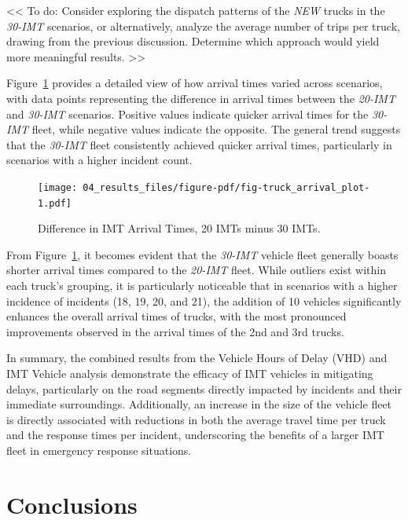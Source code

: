 \documentclass[fancy, oneside, mastersfancy, ms]{byuthesis}
\begin{document}
\textless\textless{} To do: Consider exploring the dispatch patterns of
the \emph{NEW} trucks in the \emph{30-IMT} scenarios, or alternatively,
analyze the average number of trips per truck, drawing from the previous
discussion. Determine which approach would yield more meaningful
results. \textgreater\textgreater{}

Figure~\ref{fig-truck_arrival_plot} provides a detailed view of how
arrival times varied across scenarios, with data points representing the
difference in arrival times between the \emph{20-IMT} and \emph{30-IMT}
scenarios. Positive values indicate quicker arrival times for the
\emph{30-IMT} fleet, while negative values indicate the opposite. The
general trend suggests that the \emph{30-IMT} fleet consistently
achieved quicker arrival times, particularly in scenarios with a higher
incident count.

\begin{figure}

{\centering \texttt{[image: 04\_results\_files/figure-pdf/fig-truck\_arrival\_plot-1.pdf]}

}

\caption{\label{fig-truck_arrival_plot}Difference in IMT Arrival Times,
20 IMTs minus 30 IMTs.}

\end{figure}

From Figure~\ref{fig-truck_arrival_plot}, it becomes evident that the
\emph{30-IMT} vehicle fleet generally boasts shorter arrival times
compared to the \emph{20-IMT} fleet. While outliers exist within each
truck's grouping, it is particularly noticeable that in scenarios with a
higher incidence of incidents (18, 19, 20, and 21), the addition of 10
vehicles significantly enhances the overall arrival times of trucks,
with the most pronounced improvements observed in the arrival times of
the 2nd and 3rd trucks.

In summary, the combined results from the Vehicle Hours of Delay (VHD)
and IMT Vehicle analysis demonstrate the efficacy of IMT vehicles in
mitigating delays, particularly on the road segments directly impacted
by incidents and their immediate surroundings. Additionally, an increase
in the size of the vehicle fleet is directly associated with reductions
in both the average travel time per truck and the response times per
incident, underscoring the benefits of a larger IMT fleet in emergency
response situations.


\hypertarget{conclusions}{%
\chapter{Conclusions}\label{conclusions}}
\end{document}
